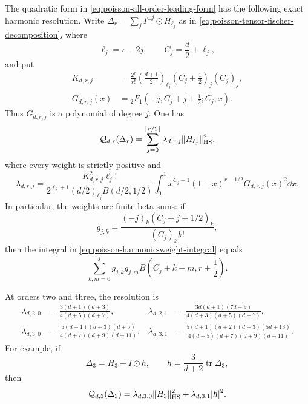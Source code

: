 \begin{theorem}
The quadratic form in \eqref{eq:poisson-all-order-leading-form} has the
following exact harmonic resolution.  Write
\(\Delta_r=\sum_jI^{\odot j}\odot H_{\ell_j}\) as in
\eqref{eq:poisson-tensor-fischer-decomposition}, where
\[
 \ell_j=r-2j,\qquad C_j=\frac d2+\ell_j,
\]
and put
\begin{align}
 K_{d,r,j}
 &=\frac{2^r}{r!}
 \left(\frac{d+1}{2}\right)_{\ell_j}
 \left(C_j+\frac12\right)_j(C_j)_j,
 \label{eq:poisson-harmonic-K}\\
 G_{d,r,j}(x)
 &={}_2F_1\left(-j,C_j+j+\frac12;C_j;x\right).
 \label{eq:poisson-harmonic-G}
\end{align}
Thus \(G_{d,r,j}\) is a polynomial of degree \(j\).  One has
\begin{equation}\label{eq:poisson-harmonic-quadratic-resolution}
 \mathcal Q_{d,r}(\Delta_r)
 =\sum_{j=0}^{\lfloor r/2\rfloor}
 \lambda_{d,r,j}\|H_{\ell_j}\|_{\rm HS}^2,
\end{equation}
where every weight is strictly positive and
\begin{equation}\label{eq:poisson-harmonic-weight-integral}
 \lambda_{d,r,j}
 =\frac{K_{d,r,j}^2\ell_j!}
 {2^{\ell_j+1}(d/2)_{\ell_j}B(d/2,1/2)}
 \int_0^1x^{C_j-1}(1-x)^{r-1/2}G_{d,r,j}(x)^2\dd x.
\end{equation}
In particular, the weights are finite beta sums: if
\[
 g_{j,k}=\frac{(-j)_k(C_j+j+1/2)_k}{(C_j)_k k!},
\]
then the integral in \eqref{eq:poisson-harmonic-weight-integral} equals
\begin{equation}\label{eq:poisson-harmonic-weight-beta-sum}
 \sum_{k,m=0}^jg_{j,k}g_{j,m}
 B\left(C_j+k+m,r+\frac12\right).
\end{equation}

At orders two and three, the resolution is
\begin{align}
 \lambda_{d,2,0}
 &=\frac{3(d+1)(d+3)}{4(d+5)(d+7)},
 &
 \lambda_{d,2,1}
 &=\frac{3d(d+1)(7d+9)}{4(d+3)(d+5)(d+7)},
 \label{eq:poisson-harmonic-order-two}\\
 \lambda_{d,3,0}
 &=\frac{5(d+1)(d+3)(d+5)}{4(d+7)(d+9)(d+11)},
 &
 \lambda_{d,3,1}
 &=\frac{5(d+1)(d+2)(d+3)(5d+13)}
 {4(d+5)(d+7)(d+9)(d+11)}.
 \label{eq:poisson-harmonic-order-three}
\end{align}
For example, if
\[
 \Delta_3=H_3+I\odot h,
 \qquad h=\frac3{d+2}\operatorname{tr}\Delta_3,
\]
then
\begin{equation}\label{eq:poisson-third-moment-explicit-coefficient}
 \mathcal Q_{d,3}(\Delta_3)
 =\lambda_{d,3,0}\|H_3\|_{\rm HS}^2
 +\lambda_{d,3,1}|h|^2.
\end{equation}


\end{theorem}
